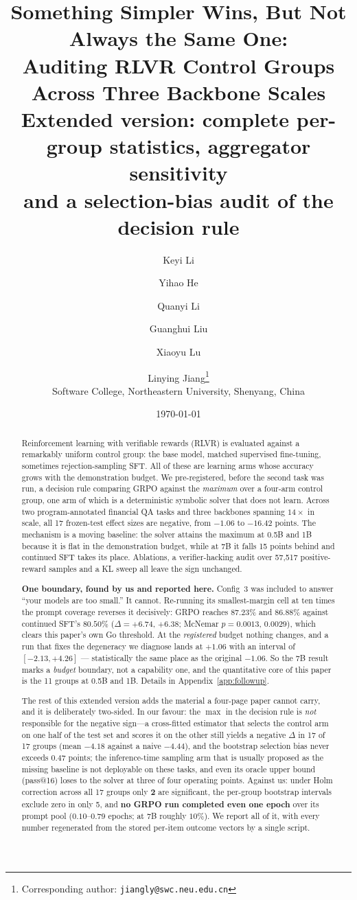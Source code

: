 \documentclass[11pt]{article}
\title{Something Simpler Wins, But Not Always the Same One:\\
Auditing RLVR Control Groups Across Three Backbone Scales\\[6pt]
\large Extended version: complete per-group statistics, aggregator sensitivity\\
and a selection-bias audit of the decision rule}
\author{Keyi Li \and Yihao He \and Quanyi Li \and Guanghui Liu \and Xiaoyu Lu \and
Linying Jiang\thanks{Corresponding author: \texttt{jiangly@swc.neu.edu.cn}}\\[4pt]
\normalsize Software College, Northeastern University, Shenyang, China}
\date{\today}
\begin{document}
\maketitle

\begin{abstract}
Reinforcement learning with verifiable rewards (RLVR) is evaluated against a
remarkably uniform control group: the base model, matched supervised
fine-tuning, sometimes rejection-sampling SFT. All of these are learning arms
whose accuracy grows with the demonstration budget. We pre-registered, before
the second task was run, a decision rule comparing GRPO against the
\emph{maximum} over a four-arm control group, one arm of which is a
deterministic symbolic solver that does not learn. Across two program-annotated
financial QA tasks and three backbones spanning $14\times$ in scale, all 17
frozen-test effect sizes are negative, from $-1.06$ to $-16.42$ points. The
mechanism is a moving baseline: the solver attains the maximum at 0.5B and 1B
because it is flat in the demonstration budget, while at 7B it falls 15 points
behind and continued SFT takes its place. Ablations, a verifier-hacking audit
over 57{,}517 positive-reward samples and a KL sweep all leave the sign
unchanged.

\medskip
\noindent
\textbf{One boundary, found by us and reported here.} Config~3 was included to
answer ``your models are too small.'' It cannot. Re-running its
smallest-margin cell at ten times the prompt coverage reverses it decisively:
GRPO reaches $87.23\%$ and $86.88\%$ against continued SFT's $80.50\%$
($\Delta = +6.74$, $+6.38$; McNemar $p = 0.0013$, $0.0029$), which clears this
paper's own Go threshold. At the \emph{registered} budget nothing changes, and a
run that fixes the degeneracy we diagnose lands at $+1.06$ with an interval of
$[-2.13, +4.26]$ --- statistically the same place as the original $-1.06$. So
the 7B result marks a \emph{budget} boundary, not a capability one, and the
quantitative core of this paper is the 11 groups at 0.5B and 1B. Details in
Appendix~\ref{app:followup}.

\medskip
\noindent
The rest of this extended version adds the material a four-page paper cannot
carry, and it is deliberately two-sided. In our favour: the $\max$ in the
decision rule is
\emph{not} responsible for the negative sign---a cross-fitted estimator that
selects the control arm on one half of the test set and scores it on the other
still yields a negative $\Delta$ in 17 of 17 groups (mean $-4.18$ against a
naive $-4.44$), and the bootstrap selection bias never exceeds $0.47$ points;
the inference-time sampling arm that is usually proposed as the missing
baseline is not deployable on these tasks, and even its oracle upper bound
(pass@16) loses to the solver at three of four operating points. Against us:
under Holm correction across all 17 groups only \textbf{2} are significant, the
per-group bootstrap intervals exclude zero in only 5, and \textbf{no GRPO run
completed even one epoch} over its prompt pool ($0.10$--$0.79$ epochs; at 7B
roughly $10\%$). We report all of it, with every number regenerated from the
stored per-item outcome vectors by a single script.
\end{abstract}
\end{document}

